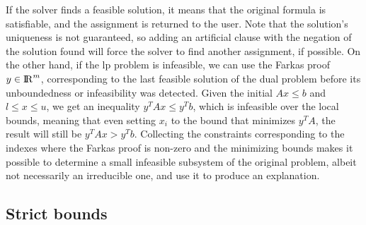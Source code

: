 \documentclass[runningheads]{llncs}
\begin{document}
If the solver finds a feasible solution, it means that the original formula is satisfiable, and the assignment is returned to the user.
Note that the solution's uniqueness is not guaranteed, so adding an artificial clause with the negation of the solution found will force the solver to find another assignment, if possible.
On the other hand, if the \gls{lp} problem is infeasible, we can use the Farkas proof $y \in {\rm I\!R}^m$, corresponding to the last feasible solution of the dual problem before its unboundedness or infeasibility was detected.
Given the initial $Ax \le b$ and $l \le x \le u$, we get an inequality $y^T A x \le y^T b$, which is infeasible over the local bounds, meaning that even setting $x_i$ to the bound that minimizes $y^T A$, the result will still be $y^T A x > y^T b$.
Collecting the constraints corresponding to the indexes where the Farkas proof is non-zero and the minimizing bounds makes it possible to determine a small infeasible subsystem of the original problem, albeit not necessarily an irreducible one, and use it to produce an explanation.

\subsection{Strict bounds}
\label{sec:strict-bounds}
\end{document}
